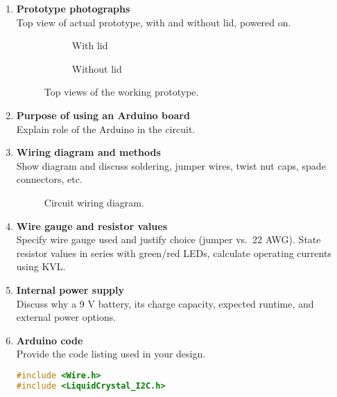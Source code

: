 \documentclass[10pt]{article}
\begin{document}
\begin{enumerate}[label=\Alph*.]
	\item \textbf{Prototype photographs}\\ Top view of actual prototype, with and
	      without lid, powered on.  \begin{figure}[H] \centering
		      \begin{subfigure}[b]{0.45\textwidth}
			      \caption{With lid} \end{subfigure} \hfill \begin{subfigure}[b]{0.45\textwidth}
			      \caption{Without lid} \end{subfigure} \caption{Top views of the working
			      prototype.} \end{figure}

	\item \textbf{Purpose of using an Arduino board}\\ Explain role of the Arduino
	      in the circuit.

	\item \textbf{Wiring diagram and methods}\\ Show diagram and discuss soldering,
	      jumper wires, twist nut caps, spade connectors, etc.  \begin{figure}[H]
		      \centering
		      \caption{Circuit wiring diagram.} \end{figure}

	\item \textbf{Wire gauge and resistor values}\\ Specify wire gauge used and
	      justify choice (jumper vs.\ 22 AWG).  State resistor values in series with
	      green/red LEDs, calculate operating currents using KVL.

	\item \textbf{Internal power supply}\\ Discuss why a 9 V battery, its charge
	      capacity, expected runtime, and external power options.

	\item \textbf{Arduino code}\\ Provide the code listing used in your design.
	      \begin{lstlisting}[language=C, caption={Arduino sketch for running average temperature monitoring}]
#include <Wire.h>
#include <LiquidCrystal_I2C.h>


\end{lstlisting}
\end{enumerate}
\end{document}
